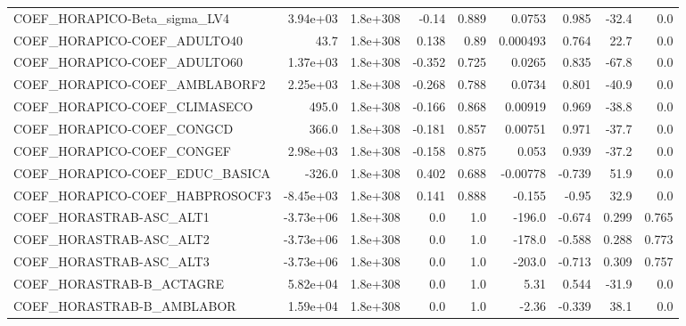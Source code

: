 \begin{tabular}{lrrrrrrrr}
COEF\_HORAPICO-Beta\_sigma\_LV4      &    3.94e+03 &     1.8e+308 &    -0.14 &    0.889 &     0.0753 &       0.985 &        -32.4 &           0.0 \\
COEF\_HORAPICO-COEF\_ADULTO40       &        43.7 &     1.8e+308 &    0.138 &     0.89 &   0.000493 &       0.764 &         22.7 &           0.0 \\
COEF\_HORAPICO-COEF\_ADULTO60       &    1.37e+03 &     1.8e+308 &   -0.352 &    0.725 &     0.0265 &       0.835 &        -67.8 &           0.0 \\
COEF\_HORAPICO-COEF\_AMBLABORF2     &    2.25e+03 &     1.8e+308 &   -0.268 &    0.788 &     0.0734 &       0.801 &        -40.9 &           0.0 \\
COEF\_HORAPICO-COEF\_CLIMASECO      &       495.0 &     1.8e+308 &   -0.166 &    0.868 &    0.00919 &       0.969 &        -38.8 &           0.0 \\
COEF\_HORAPICO-COEF\_CONGCD         &       366.0 &     1.8e+308 &   -0.181 &    0.857 &    0.00751 &       0.971 &        -37.7 &           0.0 \\
COEF\_HORAPICO-COEF\_CONGEF         &    2.98e+03 &     1.8e+308 &   -0.158 &    0.875 &      0.053 &       0.939 &        -37.2 &           0.0 \\
COEF\_HORAPICO-COEF\_EDUC\_BASICA    &      -326.0 &     1.8e+308 &    0.402 &    0.688 &   -0.00778 &      -0.739 &         51.9 &           0.0 \\
COEF\_HORAPICO-COEF\_HABPROSOCF3    &   -8.45e+03 &     1.8e+308 &    0.141 &    0.888 &     -0.155 &       -0.95 &         32.9 &           0.0 \\
COEF\_HORASTRAB-ASC\_ALT1           &   -3.73e+06 &     1.8e+308 &      0.0 &      1.0 &     -196.0 &      -0.674 &        0.299 &         0.765 \\
COEF\_HORASTRAB-ASC\_ALT2           &   -3.73e+06 &     1.8e+308 &      0.0 &      1.0 &     -178.0 &      -0.588 &        0.288 &         0.773 \\
COEF\_HORASTRAB-ASC\_ALT3           &   -3.73e+06 &     1.8e+308 &      0.0 &      1.0 &     -203.0 &      -0.713 &        0.309 &         0.757 \\
COEF\_HORASTRAB-B\_ACTAGRE          &    5.82e+04 &     1.8e+308 &      0.0 &      1.0 &       5.31 &       0.544 &        -31.9 &           0.0 \\
COEF\_HORASTRAB-B\_AMBLABOR         &    1.59e+04 &     1.8e+308 &      0.0 &      1.0 &      -2.36 &      -0.339 &         38.1 &           0.0 \\

\end{tabular}
